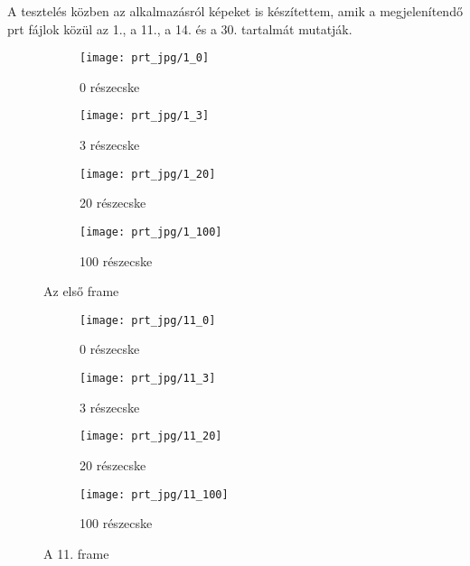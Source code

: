 A tesztelés közben az alkalmazásról képeket is készítettem,
amik a megjelenítendő prt fájlok közül az 1., a 11., a 14. 
és a 30. tartalmát mutatják.

\begin{figure}[!htb]
    \centering
    \begin{subfigure}[!htb]{0.49\textwidth}
        \centering
        \texttt{[image: prt\_jpg/1\_0]}
        \caption{0 részecske}
    \end{subfigure}
    \hfill
    \begin{subfigure}[!htb]{0.49\textwidth}
        \centering
        \texttt{[image: prt\_jpg/1\_3]}
        \caption{3 részecske}
    \end{subfigure}
    \hfill
    \begin{subfigure}[!htb]{0.49\textwidth}
        \centering
        \texttt{[image: prt\_jpg/1\_20]}
        \caption{20 részecske}
    \end{subfigure}
    \hfill
    \begin{subfigure}[!htb]{0.49\textwidth}
        \centering
        \texttt{[image: prt\_jpg/1\_100]}
        \caption{100 részecske}
    \end{subfigure}
    \caption{Az első frame}
    \label{fig:x firstframe}
\end{figure}

\begin{figure}[!htb]
    \centering
    \begin{subfigure}[!htb]{0.49\textwidth}
        \centering
        \texttt{[image: prt\_jpg/11\_0]}
        \caption{0 részecske}
    \end{subfigure}
    \hfill
    \begin{subfigure}[!htb]{0.49\textwidth}
        \centering
        \texttt{[image: prt\_jpg/11\_3]}
        \caption{3 részecske}
    \end{subfigure}
    \hfill
    \begin{subfigure}[!htb]{0.49\textwidth}
        \centering
        \texttt{[image: prt\_jpg/11\_20]}
        \caption{20 részecske}
    \end{subfigure}
    \hfill
    \begin{subfigure}[!htb]{0.49\textwidth}
        \centering
        \texttt{[image: prt\_jpg/11\_100]}
        \caption{100 részecske}
    \end{subfigure}
    \caption{A 11. frame}
    \label{fig:x frameeleven}
\end{figure}

